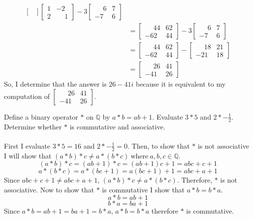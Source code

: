 \documentclass[titlepage]{article}
\newenvironment{problem}[2][Problem]{\begin{trivlist}
\item[\hskip \labelsep {\bfseries #1}\hskip \labelsep {\bfseries #2.}]}{\end{trivlist}}
\begin{document}
\begin{problem}{1}
\begin{align*}
\begin{bmatrix}
	\end{bmatrix}
	\begin{bmatrix}
		1 & -2 \\ 2 & \phantom{-}1
	\end{bmatrix}
	-3 \begin{bmatrix}
		\phantom{-}6 & 7 \\ -7 & 6
	\end{bmatrix} \\
	&= \begin{bmatrix}
		\phantom{-}44 & 62 \\ -62 & 44
	\end{bmatrix}
	-3\begin{bmatrix}
		\phantom{-}6 & 7 \\ -7 & 6
	\end{bmatrix}
	\\ &=
	\begin{bmatrix}
		\phantom{-}44 & 62 \\ -62 & 44
	\end{bmatrix}
	-\begin{bmatrix}
		\phantom{-}18 & 21 \\ -21 & 18
	\end{bmatrix}
	\\ &=
	\begin{bmatrix}
		\phantom{-}26 & 41 \\ -41 & 26
	\end{bmatrix}
\end{align*}
So, I determine that the answer is $26 - 41i$ because it is equivalent to my computation of
$
\begin{bmatrix}
	\phantom{-}26 & 41 \\ -41 & 26
\end{bmatrix}
.$
\end{problem}

\begin{problem}{3}
	Define a binary operator $*$ on $\mathbb{Q}$ by $a*b = ab+1$. Evaluate $3*5$ and $2*-\frac{1}{2}$.\\
	Determine whether $*$ is commutative and associative.
	\\ \\
	First I evaluate $3*5 = 16$ and $2*-\frac{1}{2} = 0$.
	Then, to show that $*$ is not associative I will show that $(a*b)*c \neq a*(b*c) \ \text{where} \ a,b,c \in \mathbb{Q}$.
	$$(a*b)*c = (ab+1)*c = (ab+1)c + 1 = abc+c+1$$
	$$a*(b*c) = a*(bc+1) = a(bc+1) + 1 = abc+a+1$$
	Since $abc+c+1 \neq abc+a+1$, $(a*b)*c \neq a*(b*c)$. Therefore, $*$ is not associative.
	Now to show that $*$ is commutative I show that $a*b = b*a$.
	$$a*b=ab+1$$
	$$b*a=ba+1$$
	Since $a*b=ab+1=ba+1=b*a$, $a*b = b*a$ therefore $*$ is commutative.
\end{problem}
\end{document}
